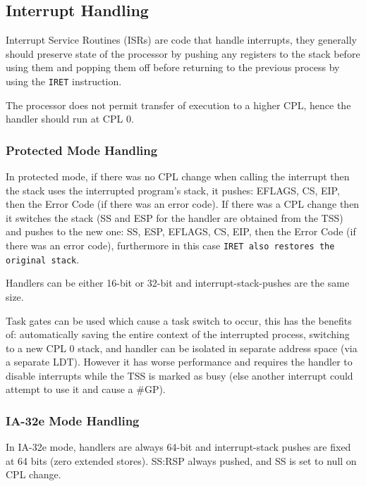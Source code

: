 \documentclass{article}
\newcommand{\layout}[1]{\parbox{\linewidth}{#1}}
\begin{document}
\layout{
  \subsection{Interrupt Handling}

  Interrupt Service Routines (ISRs) are code that handle interrupts, they generally should preserve state of the processor by pushing any registers to the stack before using them and popping them off before returning to the previous process by using the \texttt{IRET} instruction.
} \bigskip

\layout{
  The processor does not permit transfer of execution to a higher CPL, hence the handler should run at CPL 0.

  \bigskip \cite[Chapter~7.12.1.2]{sdm3}
} \bigskip

\layout{
  \subsubsection{Protected Mode Handling}

  In protected mode, if there was no CPL change when calling the interrupt then the stack uses the interrupted program's stack,
  it pushes: EFLAGS, CS, EIP, then the Error Code (if there was an error code).
  If there was a CPL change then it switches the stack (SS and ESP for the handler are obtained from the TSS) and pushes to the new one: SS, ESP, EFLAGS, CS, EIP, then the Error Code (if there was an error code), furthermore in this case \texttt{IRET also restores the original stack}.

  \bigskip \cite[Chapter~7.12.1]{sdm3} \bigskip
}

Handlers can be either 16-bit or 32-bit and interrupt-stack-pushes are the same size.

\bigskip

\layout{
  Task gates can be used which cause a task switch to occur, this has the benefits of: automatically saving the entire context of the interrupted process, switching to a new CPL 0 stack, and handler can be isolated in separate address space (via a separate LDT).
  However it has worse performance and requires the handler to disable interrupts while the TSS is marked as busy (else another interrupt could attempt to use it and cause a \#GP).

  \bigskip \cite[Chapter~7.12.2]{sdm3}
}

\layout {
  \subsubsection{IA-32e Mode Handling}

  In IA-32e mode, handlers are always 64-bit and interrupt-stack pushes are fixed at 64 bits (zero extended stores).
  SS:RSP always pushed, and SS is set to null on CPL change.

  \bigskip \cite[Chapter~7.14]{sdm3}
} \bigskip
\end{document}
